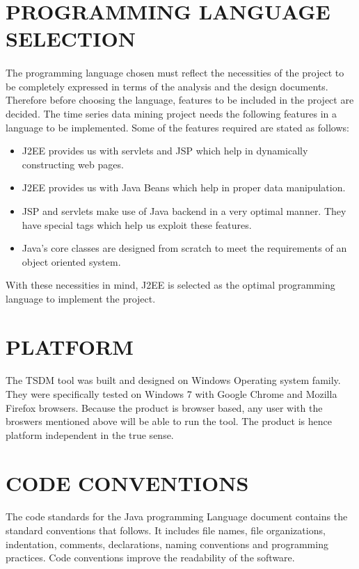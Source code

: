 \documentclass[12pt]{report}
\begin{document}
\section{PROGRAMMING LANGUAGE SELECTION}

\paragraph{}The programming language chosen must reflect the necessities of the project to be completely expressed in terms of the analysis and the design documents. Therefore before choosing the language, features to be included in the project are decided. The time series data mining project needs the following features in a language to be implemented. Some of the features required are stated as follows:
\begin{itemize}
\item J2EE provides us with servlets and JSP which help in dynamically constructing web pages.
\item J2EE provides us with Java Beans which help in proper data manipulation.
\item JSP and servlets make use of Java backend in a very optimal manner. They have special tags which help us exploit these features.
\item Java's core classes are designed from scratch to meet the requirements of an object oriented system.
\end{itemize} 
With these necessities in mind, J2EE is selected as the optimal programming language to implement the project.
\section{PLATFORM}
\paragraph{}The TSDM tool was built and designed on Windows Operating system family. They were specifically tested on Windows 7 with Google Chrome and Mozilla Firefox browsers. Because the product is browser based, any user with the broswers mentioned above will be able to run the tool. The product is hence platform independent in the true sense.
\section{CODE CONVENTIONS}
\paragraph{}The code standards for the Java programming Language document contains the standard conventions that follows. It includes file names, file organizations, indentation, comments, declarations, naming conventions and programming practices. Code conventions improve the readability of the software.
\end{document}
